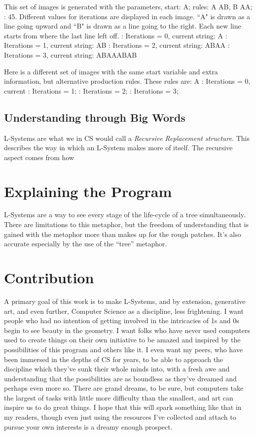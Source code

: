 \documentclass[12pt,twoside]{reedthesis}
\begin{document}
This set of images is generated with the parameters, start: A; rules: A \rightarrow AB, B \rightarrow AA; \theta: 45\degree. Different values for iterations are displayed in each image. ``A" is drawn as a line going upward and ``B" is drawn as a line going to the right. Each new line starts from where the last line left off.
: Iterations = 0, current string: A
: Iterations = 1, current string: AB
: Iterations = 2, current string: ABAA
: Iterations = 3, current string: ABAAABAB


Here is a different set of images with the same start variable and extra information, but alternative production rules. These rules are: A 
: Iterations = 0, current 
: Iterations = 1;
: Iterations = 2;
: Iterations = 3;

\section{Understanding through Big Words}
L-Systems are what we in CS would call a \textit{Recursive Replacement structure}. This describes the way in which an L-System makes more of itself. The recursive aspect comes from how 

\chapter{Explaining the Program}



L-Systems are a way to see every stage of the life-cycle of a tree simultaneously. There are limitations to this metaphor, but the freedom of understanding that is gained with the metaphor more than makes up for the rough patches. It’s also accurate especially by the use of the “tree” metaphor. 

\chapter{Contribution}
	A primary goal of this work is to make L-Systems, and by extension, generative art, and even further, Computer Science as a discipline, less frightening. I want people who had no intention of getting involved in the intricacies of 1s and 0s begin to see beauty in the geometry. I want folks who have never used computers used to create things on their own initiative to be amazed and inspired by the possibilities of this program and others like it. I even want my peers, who have been immersed in the depths of CS for years, to be able to approach the discipline which they’ve sunk their whole minds into, with a fresh awe and understanding that the possibilities are as boundless as they’ve dreamed and perhaps even more so. There are grand dreams, to be sure, but computers take the largest of tasks with little more difficulty than the smallest, and art can inspire us to do great things. I hope that this will spark something like that in my readers, though even just using the resources I’ve collected and attach to pursue your own interests is a dreamy enough prospect.
	
\end{document}
